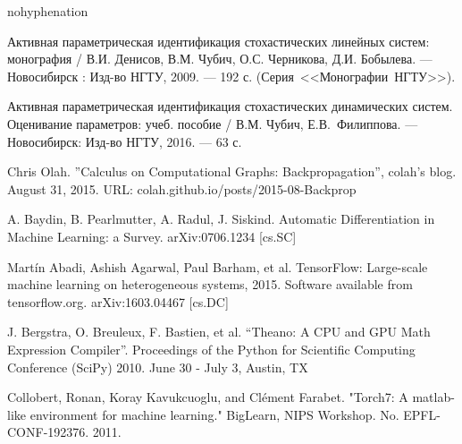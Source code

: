 \documentclass[a4paper,14pt]{extarticle}
\begin{document}
\begin{thebibliography}{9}

\begin{hyphenrules}{nohyphenation} 


\begin{sloppypar}

 Активная параметрическая идентификация стохастических
линейных систем: монография / В.И. Денисов, В.М. Чубич, О.С. Черникова, Д.И.
	Бобылева. --- Новосибирск : Изд-во НГТУ, 2009. --- 192 с.
	\mbox{(Серия <<Монографии НГТУ>>)}.

 Активная параметрическая идентификация стохастических
	динамических систем. Оценивание параметров: учеб. пособие / В.М. Чубич,
	\mbox{Е.В. Филиппова}. --- Новосибирск: Изд-во НГТУ, 2016. --- 63 с.

 Chris Olah. ''Calculus on Computational Graphs:
Backpropagation'', colah's blog. August 31, 2015.
URL: colah.github.io/posts/2015-08-Backprop

 A. Baydin, B. Pearlmutter, A. Radul, J. Siskind.
Automatic Differentiation in Machine Learning: a Survey. {arXiv:0706.1234 [cs.SC]}

 Martín Abadi, Ashish Agarwal, Paul Barham, et al.
TensorFlow: Large-scale machine learning on heterogeneous systems,
2015. Software available from tensorflow.org. {arXiv:1603.04467 [cs.DC]}

 J. Bergstra, O. Breuleux, F. Bastien, et al. “Theano: A CPU
and GPU Math Expression Compiler”. Proceedings of the Python for Scientific
Computing Conference (SciPy) 2010. June 30 - July 3, Austin, TX

 Collobert, Ronan, Koray Kavukcuoglu, and Clément Farabet.
"Torch7: A matlab-like environment for machine learning." BigLearn, NIPS
Workshop. No. EPFL-CONF-192376. 2011.

\end{sloppypar}

\end{hyphenrules}

\end{thebibliography}
\end{document}
